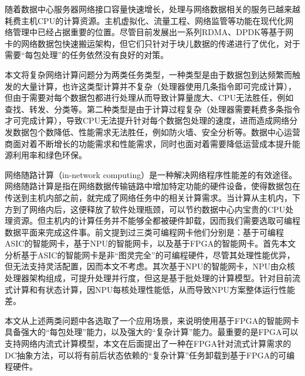 




%
%

随着数据中心服务器网络接口容量快速增长，处理与网络数据相关的服务已越来越耗费主机CPU的计算资源。主机虚拟化、流量工程、网络监管等功能在现代化网络管理中已经占据重要的位置。尽管目前发展出一系列RDMA、DPDK等基于网卡的网络数据包快速搬运架构，但它们只针对于块儿数据的传递进行了优化，对于需要“每包处理”的任务依然没有良好的对策。



本文将复杂网络计算问题分为两类任务类型，一种类型是由于数据包到达频繁而触发的大量计算，也许这类型计算并不复杂（处理器使用几条指令即可完成计算），但由于需要对每个数据包都进行处理从而导致计算量庞大、CPU无法胜任，例如查找、转发、分类等。第二种类型是由于计算过程复杂（处理器需要耗费多条指令才可完成计算），导致CPU无法提升针对每个数据包处理的速度，进而造成网络分发数据包个数降低、性能需求无法胜任，例如防火墙、安全分析等。数据中心运营商面对着不断增长的功能需求和性能需求，同时也面对着需要降低运营成本提升能源利用率和绿色环保。

网络随路计算（in-network computing）是一种解决网络程序性能差的有效途径。网络随路计算是指在网络数据传输链路中增加特定功能的硬件设备，使得数据包在传送到主机内部之前，就完成了网络任务中的相关计算需求。当计算从主机内，下方到了网络内后，这便释放了软件处理瓶颈，可以节约数据中心内宝贵的CPU处理资源。但主机内的计算任务并不能够全都被硬件卸载，因而我们需要选取可编程数据平面来完成这件事。前文提到过三类可编程网卡他们分别是：基于可编程ASIC的智能网卡，基于NPU的智能网卡，以及基于FPGA的智能网卡。首先本文分析基于ASIC的智能网卡是非“图灵完全”的可编程硬件，尽管其处理性能优异，但无法支持灵活配置，因而本文不考虑。其次基于NPU的智能网卡，NPU由众核处理器架构组成，可提升处理并行度，但这是基于批处理的计算模型。针对目前流式计算和有状态计算，因NPU每核处理性能低，从而导致NPU方案整体运行性能差。

本文从上述两类问题中各选取了一个应用场景，来说明使用基于FPGA的智能网卡具备强大的“每包处理”能力，以及强大的“复杂计算”能力。最重要的是FPGA可以支持网络内流式计算模型，本文在后面提出了一种在FPGA针对流式计算需求的DC抽象方法，可以将有前后状态依赖的“复杂计算”任务卸载到基于FPGA的可编程硬件。




